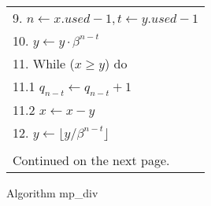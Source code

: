 \documentclass[b5paper]{book}
\begin{document}
\begin{figure}[!here]
\begin{small}
\begin{center}
\begin{tabular}{l}
9.  $n \leftarrow x.used - 1, t \leftarrow y.used - 1$ \\
10.  $y \leftarrow y \cdot \beta^{n - t}$ \\
11.  While ($x \ge y$) do \\
\hspace{3mm}11.1  $q_{n - t} \leftarrow q_{n - t} + 1$ \\
\hspace{3mm}11.2  $x \leftarrow x - y$ \\
12.  $y \leftarrow \lfloor y / \beta^{n-t} \rfloor$ \\
\\
Continued on the next page. \\
\hline
\end{tabular}
\end{center}
\end{small}
\caption{Algorithm mp\_div}
\end{figure}
\end{document}
